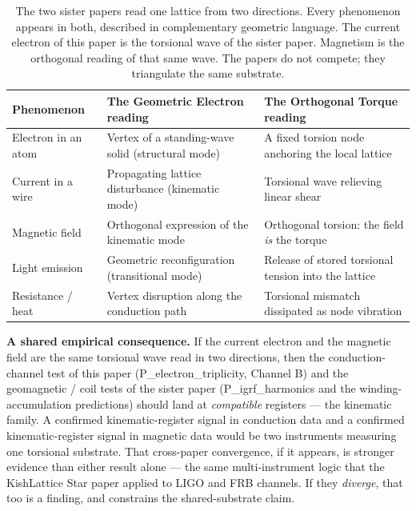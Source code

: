 \documentclass[11pt, letterpaper, openany]{book}
\begin{document}
\begin{table}[H]
\centering
\renewcommand{\arraystretch}{1.5}
\small
\begin{tabular}{|p{4.2cm}|p{4.0cm}|p{4.0cm}|}
\hline
\rowcolor{kishblue!10}
\textbf{Phenomenon} & \textbf{The Geometric Electron reading} &
\textbf{The Orthogonal Torque reading} \\
\hline\hline
Electron in an atom &
Vertex of a standing-wave solid (structural mode) &
A fixed torsion node anchoring the local lattice \\
\hline
Current in a wire &
Propagating lattice disturbance (kinematic mode) &
Torsional wave relieving linear shear \\
\hline
Magnetic field &
Orthogonal expression of the kinematic mode &
Orthogonal torsion: the field \emph{is} the torque \\
\hline
Light emission &
Geometric reconfiguration (transitional mode) &
Release of stored torsional tension into the lattice \\
\hline
Resistance / heat &
Vertex disruption along the conduction path &
Torsional mismatch dissipated as node vibration \\
\hline
\end{tabular}
\caption{The two sister papers read one lattice from two directions. Every
phenomenon appears in both, described in complementary geometric language.
The current electron of this paper is the torsional wave of the sister
paper. Magnetism is the orthogonal reading of that same wave. The papers
do not compete; they triangulate the same substrate.}
\end{table}
 
\begin{empiricalbox}
\textbf{A shared empirical consequence.}
If the current electron and the magnetic field are the same torsional wave
read in two directions, then the conduction-channel test of this paper
(P\_electron\_triplicity, Channel B) and the geomagnetic / coil tests of
the sister paper (P\_igrf\_harmonics and the winding-accumulation
predictions) should land at \emph{compatible} registers --- the kinematic
family. A confirmed kinematic-register signal in conduction data and a
confirmed kinematic-register signal in magnetic data would be two
instruments measuring one torsional substrate. That cross-paper
convergence, if it appears, is stronger evidence than either result alone
--- the same multi-instrument logic that the KishLattice Star paper applied
to LIGO and FRB channels. If they \emph{diverge}, that too is a finding,
and constrains the shared-substrate claim.
\end{empiricalbox}
 
\end{document}
